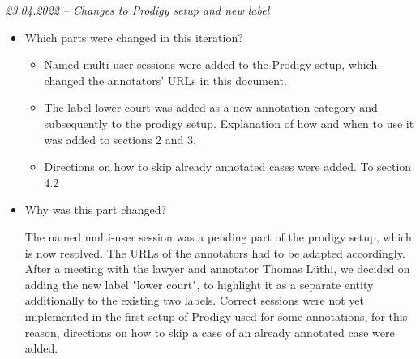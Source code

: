 \documentclass{article}
\begin{document}
\begin{mdframed}
\emph{23.04.2022 – Changes to Prodigy setup and new label}
\begin{itemize}
	\item Which parts were changed in this iteration? 
	\begin{itemize}
	    \item Named multi-user sessions were added to the Prodigy setup, which changed the annotators' URLs in this document.
	    \item The label lower court was added as a new annotation category and subsequently to the prodigy setup. Explanation of how and when to use it was added to sections 2 and 3.
	    \item Directions on how to skip already annotated cases were added. To section 4.2
	\end{itemize} 
    \item Why was this part changed?
    
    The named multi-user session was a pending part of the prodigy setup, which is now resolved. The URLs of the annotators had to be adapted accordingly. After a meeting with the lawyer and annotator Thomas Lüthi, we decided on adding the new label "lower court", to highlight it as a separate entity additionally to the existing two labels. 
    Correct sessions were not yet implemented in the first setup of Prodigy used for some annotations, for this reason, directions on how to skip a case of an already annotated case were added.
    
\end{itemize}
\end{mdframed}
\pagebreak
\end{document}
